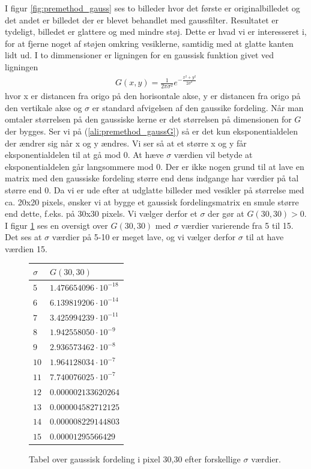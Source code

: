 I figur \ref{fig:premethod_gauss} ses to billeder hvor det første er originalbilledet og det andet er billedet der er blevet behandlet med gaussfilter. Resultatet er tydeligt, billedet er glattere og med mindre støj. Dette er hvad vi er interesseret i, for at fjerne noget af støjen omkring vesiklerne, samtidig med at glatte kanten lidt ud. I to dimmensioner er ligningen for en gaussisk funktion givet ved ligningen
\begin{align}
	G(x,y) = \frac{1}{2\pi\sigma^2}e^{-\frac{x^2+y^2}{2\sigma^2}}\label{ali:premethod_gaussG}
\end{align}
hvor x er distancen fra origo på den horisontale akse, y er distancen fra origo på den vertikale akse og $\sigma$ er standard afvigelsen af den gaussike fordeling. Når man omtaler størrelsen på den gaussiske kerne er det størrelsen på dimensionen for $G$ der bygges. Ser vi på (\ref{ali:premethod_gaussG}) så er det kun eksponentialdelen der ændrer sig når x og y ændres. Vi ser så at et større x og y får eksponentialdelen til at gå mod 0. At hæve $\sigma$ værdien vil betyde at eksponentialdelen går langsommere mod 0. Der er ikke nogen grund til at lave en matrix med den gaussiske fordeling større end dens indgange har værdier på tal større end 0. Da vi er ude efter at udglatte billeder med vesikler på størrelse med ca. 20x20 pixels, ønsker vi at bygge et gaussisk fordelingsmatrix en smule større end dette, f.eks. på 30x30 pixels. Vi vælger derfor et $\sigma$ der gør at $G(30,30) > 0$. I figur \ref{fig:premethod_gauss_table} ses en oversigt over $G(30,30)$ med $\sigma$ værdier varierende fra 5 til 15. Det ses at $\sigma$ værdier på 5-10 er meget lave, og vi vælger derfor $\sigma$ til at have værdien 15.  
 
\begin{figure}[H]
	\centering
	\begin{tabular}{l | l}
			\textbf{$\sigma$} & $G(30,30)$\\
			\hline
			$5$ & $1.476654096\cdot10^{-18}$\\
			$6$ & $6.139819206\cdot10^{-14}$\\
			$7$ & $3.425994239\cdot10^{-11}$\\
			$8$ & $1.942558050\cdot10^{-9}$\\
			$9$ & $2.936573462\cdot10^{-8}$\\
			$10$ & $1.964128034\cdot10^{-7}$\\
			$11$ & $7.740076025\cdot10^{-7}$\\
			$12$ & $0.000002133620264$\\
			$13$ & $0.000004582712125$\\
			$14$ & $0.000008229144803$\\
			$15$ & $0.00001295566429$
	\end{tabular}
	\caption{Tabel over gaussisk fordeling i pixel 30,30 efter forskellige $\sigma$ værdier.\label{fig:premethod_gauss_table}}
\end{figure}

